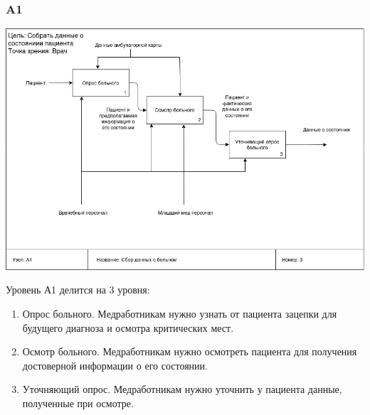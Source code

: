 \documentclass[a4paper, 12pt]{article}
\begin{document}
\subsubsection{A1}
\begin{center}
  \centering
  \includegraphics[width=1\linewidth]{extra/as-is_A1.png}
  \label{fig:prplot}
\end{center}
Уровень А1 делится на 3 уровня:
\begin{enumerate}
  \item Опрос больного. Медработникам нужно узнать от пациента зацепки для будущего диагноза и осмотра критических мест.
  \item Осмотр больного. Медработникам нужно осмотреть пациента для получения достоверной информации о его состоянии.
  \item Уточняющий опрос. Медработникам нужно уточнить у пациента данные, полученные при осмотре.
\end{enumerate}
\end{document}
